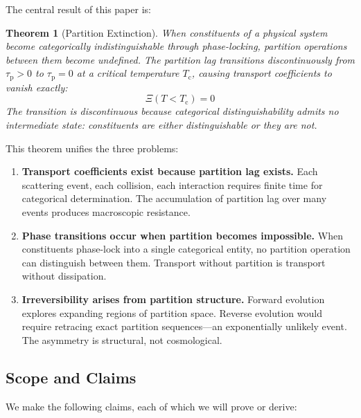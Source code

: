 \documentclass[twocolumn,10pt,aps,prd,superscriptaddress,nofootinbib]{revtex4-2}
\newtheorem{theorem}{Theorem}[section]
\theoremstyle{remark}
\newcommand{\tauP}{\tau_{\mathrm{p}}}
\newcommand{\Tcrit}{T_{\mathrm{c}}}
\newcommand{\Transp}{\Xi}
\begin{document}
The central result of this paper is:

\begin{theorem}[Partition Extinction]
\label{thm:partition_extinction_main}
When constituents of a physical system become categorically indistinguishable through phase-locking, partition operations between them become undefined. The partition lag transitions discontinuously from $\tauP > 0$ to $\tauP = 0$ at a critical temperature $\Tcrit$, causing transport coefficients to vanish exactly:
\begin{equation}
\Transp(T < \Tcrit) = 0
\label{eq:extinction_main}
\end{equation}
The transition is discontinuous because categorical distinguishability admits no intermediate state: constituents are either distinguishable or they are not.
\end{theorem}

This theorem unifies the three problems:

\begin{enumerate}
\item \textbf{Transport coefficients exist because partition lag exists.} Each scattering event, each collision, each interaction requires finite time for categorical determination. The accumulation of partition lag over many events produces macroscopic resistance.

\item \textbf{Phase transitions occur when partition becomes impossible.} When constituents phase-lock into a single categorical entity, no partition operation can distinguish between them. Transport without partition is transport without dissipation.

\item \textbf{Irreversibility arises from partition structure.} Forward evolution explores expanding regions of partition space. Reverse evolution would require retracing exact partition sequences---an exponentially unlikely event. The asymmetry is structural, not cosmological.
\end{enumerate}

\subsection{Scope and Claims}

We make the following claims, each of which we will prove or derive:
\end{document}

